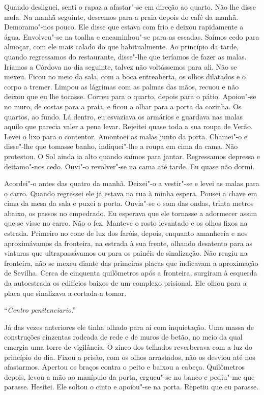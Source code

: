Quando desliguei, senti o rapaz a afastar"-se em direção ao quarto. Não
lhe disse nada. Na manhã seguinte, descemos para a praia depois do
café da manhã. Demoramo"-nos pouco. Ele disse que estava com frio e
deixou rapidamente a água. Envolveu"-se na toalha e encaminhou"-se para
as escadas. Saímos cedo para almoçar, com ele mais calado do que
habitualmente. Ao princípio da tarde, quando regressamos do restaurante,
disse"-lhe que teríamos de fazer as malas. Iríamos a Córdova no dia
seguinte, talvez não voltássemos para ali. Não se mexeu. Ficou no meio
da sala, com a boca entreaberta, os olhos dilatados e o corpo a tremer.
Limpou as lágrimas com as palmas das mãos, recuou e não deixou que eu
lhe tocasse. Correu para o quarto, depois para o pátio. Apoiou"-se no
muro, de costas para a praia, e ficou a olhar para a porta da cozinha.
Os quartos, ao fundo. Lá dentro, eu esvaziava os armários e guardava nas
malas aquilo que parecia valer a pena levar. Rejeitei quase toda a sua
roupa de Verão. Levei o lixo para o contentor. Amontoei as malas junto
da porta. Chamei"-o e disse"-lhe que tomasse banho, indiquei"-lhe a
roupa em cima da cama. Não protestou. O Sol ainda ia alto quando saímos
para jantar. Regressamos depressa e deitamo"-nos cedo. Ouvi"-o
revolver"-se na cama até tarde. Eu quase não dormi.

Acordei"-o antes das quatro da manhã. Deixei"-o a vestir"-se e levei as
malas para o carro. Quando regressei ele já estava na rua à minha
espera. Pousei a chave em cima da mesa da sala e puxei a porta.
Ouvia"-se o som das ondas, trinta metros abaixo, os passos no empedrado.
Eu esperava que ele tornasse a adormecer assim que se visse no carro.
Não o fez. Manteve o rosto levantado e os olhos fixos na estrada.
Primeiro no cone de luz dos faróis, depois, enquanto amanhecia e nos
aproximávamos da fronteira, na estrada à sua frente, olhando desatento
para as viaturas que ultrapassávamos ou para os painéis de sinalização.
Não reagiu na fronteira, não se mexeu diante das primeiras placas que
indicavam a aproximação de Sevilha. Cerca de cinquenta quilômetros após
a fronteira, surgiram à esquerda da autoestrada os edifícios baixos de
um complexo prisional. Ele olhou para a placa que sinalizava a cortada a
tomar.

``\emph{Centro penitenciario}.''

Já das vezes anteriores ele tinha olhado para aí com inquietação. Uma
massa de construções cinzentas rodeada de rede e de muros de betão, no
meio da qual emergia uma torre de vigilância. O zinco dos telhados
reverberava com a luz do princípio do dia. Fixou a prisão, com os olhos
arrastados, não os desviou até nos afastarmos. Apertou os braços contra
o peito e baixou a cabeça. Quilômetros depois, levou a mão ao manípulo
da porta, ergueu"-se no banco e pediu"-me que parasse. Hesitei. Ele
soltou o cinto e apoiou"-se na porta. Repetiu que eu parasse.

